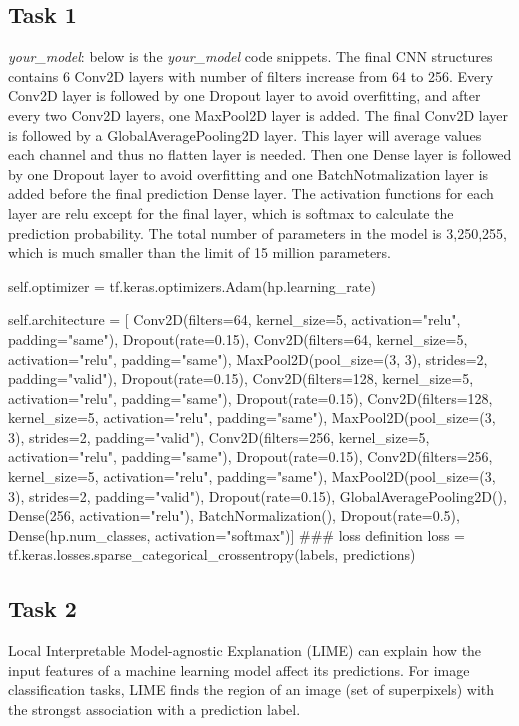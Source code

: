 \subsection*{Task 1}
\emph{your\_model}: below is the \textit{your\_model} code snippets. The final CNN structures contains 6 Conv2D layers with number of filters increase from 64 to 256. Every Conv2D layer is followed by one Dropout layer to avoid overfitting, and after every two Conv2D layers, one MaxPool2D layer is added. The final Conv2D layer is followed by a GlobalAveragePooling2D layer. This layer will average values each channel and thus no flatten layer is needed. Then one Dense layer is followed by one Dropout layer to avoid overfitting and one BatchNotmalization layer is added before the final prediction Dense layer. The activation functions for each layer are relu except for the final layer, which is softmax to calculate the prediction probability. The total number of parameters in the model is 3,250,255, which is much smaller than the limit of 15 million parameters.
\begin{python}
self.optimizer = tf.keras.optimizers.Adam(hp.learning_rate)

self.architecture = [
              Conv2D(filters=64, kernel_size=5, activation="relu", padding="same"),
              Dropout(rate=0.15),
              Conv2D(filters=64, kernel_size=5, activation="relu", padding="same"),
              MaxPool2D(pool_size=(3, 3), strides=2, padding="valid"),
              Dropout(rate=0.15),
              Conv2D(filters=128, kernel_size=5, activation="relu", padding="same"),
              Dropout(rate=0.15),
              Conv2D(filters=128, kernel_size=5, activation="relu", padding="same"),
              MaxPool2D(pool_size=(3, 3), strides=2, padding="valid"),
              Conv2D(filters=256, kernel_size=5, activation="relu", padding="same"),
              Dropout(rate=0.15),
              Conv2D(filters=256, kernel_size=5, activation="relu", padding="same"),
              MaxPool2D(pool_size=(3, 3), strides=2, padding="valid"),
              Dropout(rate=0.15),
              GlobalAveragePooling2D(),
              Dense(256, activation="relu"),
              BatchNormalization(),
              Dropout(rate=0.5),
              Dense(hp.num_classes, activation="softmax")]
### loss definition
loss = tf.keras.losses.sparse_categorical_crossentropy(labels, predictions)
\end{python}

\subsection*{Task 2}
Local Interpretable Model-agnostic Explanation (LIME) can explain how the input features of a machine learning model affect its predictions. For image classification tasks, LIME finds the region of an image (set of superpixels) with the strongst association with a prediction label.

